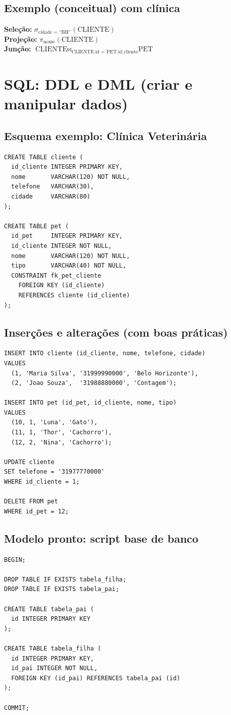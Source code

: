 \documentclass[12pt,a4paper]{article}
\begin{document}
\subsection{Exemplo (conceitual) com clínica}
\textbf{Seleção:} $\sigma_{\text{cidade = ``BH''}}(\text{CLIENTE})$\\
\textbf{Projeção:} $\pi_{\text{nome}}(\text{CLIENTE})$\\
\textbf{Junção:} $\text{CLIENTE} \bowtie_{\text{CLIENTE.id = PET.id\_cliente}} \text{PET}$

\section{SQL: DDL e DML (criar e manipular dados)}

\subsection{Esquema exemplo: Clínica Veterinária}
\begin{lstlisting}[style=sql]
CREATE TABLE cliente (
  id_cliente INTEGER PRIMARY KEY,
  nome       VARCHAR(120) NOT NULL,
  telefone   VARCHAR(30),
  cidade     VARCHAR(80)
);

CREATE TABLE pet (
  id_pet     INTEGER PRIMARY KEY,
  id_cliente INTEGER NOT NULL,
  nome       VARCHAR(120) NOT NULL,
  tipo       VARCHAR(40) NOT NULL,
  CONSTRAINT fk_pet_cliente
    FOREIGN KEY (id_cliente)
    REFERENCES cliente (id_cliente)
);
\end{lstlisting}

\subsection{Inserções e alterações (com boas práticas)}
\begin{lstlisting}[style=sql]
INSERT INTO cliente (id_cliente, nome, telefone, cidade)
VALUES
  (1, 'Maria Silva', '31999990000', 'Belo Horizonte'),
  (2, 'Joao Souza',  '31988880000', 'Contagem');

INSERT INTO pet (id_pet, id_cliente, nome, tipo)
VALUES
  (10, 1, 'Luna', 'Gato'),
  (11, 1, 'Thor', 'Cachorro'),
  (12, 2, 'Nina', 'Cachorro');

UPDATE cliente
SET telefone = '31977770000'
WHERE id_cliente = 1;

DELETE FROM pet
WHERE id_pet = 12;
\end{lstlisting}

\subsection{Modelo pronto: script base de banco}
\begin{lstlisting}[style=sql]
BEGIN;

DROP TABLE IF EXISTS tabela_filha;
DROP TABLE IF EXISTS tabela_pai;

CREATE TABLE tabela_pai (
  id INTEGER PRIMARY KEY
);

CREATE TABLE tabela_filha (
  id INTEGER PRIMARY KEY,
  id_pai INTEGER NOT NULL,
  FOREIGN KEY (id_pai) REFERENCES tabela_pai (id)
);

COMMIT;
\end{lstlisting}
\end{document}
